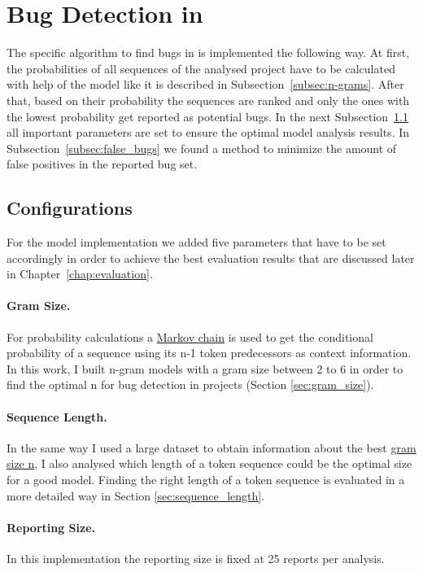 \section{Bug Detection in \scratch{}}\label{sec:detection}
The specific algorithm to find bugs in \scratch{} is implemented the following way. At first, the probabilities of all sequences of the analysed project have to be calculated with help of the model like it is described in Subsection~\ref{subsec:n-grams}. After that, based on their probability the sequences are ranked and only the ones with the lowest probability get reported as potential bugs. In the next Subsection~\ref{subsec:configurations} all important parameters are set to ensure the optimal model analysis results. In Subsection~\ref{subsec:false_bugs} we found a method to minimize the amount of false positives in the reported bug set.

\subsection{Configurations}\label{subsec:configurations}
For the \scratch{} model implementation we added five parameters that have to be set accordingly in order to achieve the best evaluation results that are discussed later in Chapter~\ref{chap:evaluation}.

\paragraph{Gram Size.}
For probability calculations a \hyperref[def:markov_chain]{Markov chain} is used to get the conditional probability of a sequence using its n-1 token predecessors as context information. In this work, I built n-gram models with a gram size between 2 to 6 in order to find the optimal n for bug detection in \scratch{} projects (Section \ref{sec:gram_size}). 
\paragraph{Sequence Length.}
In the same way I used a large dataset to obtain information about the best \hyperref[def:gram_size]{gram size n}, I also analysed which length of a token sequence could be the optimal size for a good model. Finding the right length of a token sequence is evaluated in a more detailed way in Section \ref{sec:sequence_length}.
\paragraph{Reporting Size.}
In this implementation the reporting size is fixed at 25 reports per analysis. 

